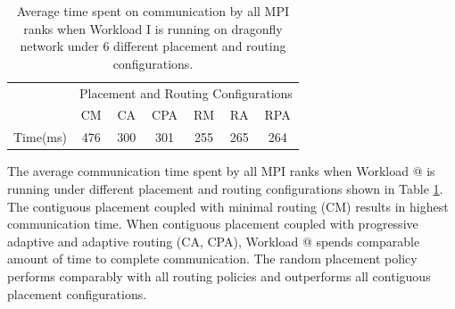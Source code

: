 \documentclass[conference,compsoc]{IEEEtran}
\makeatletter
\newcommand{\Rmnum}[1]{\expandafter\@slowromancap\romannumeral #1@}
\makeatother
\begin{document}
\begin{table}[ht]
\begin{center}
\caption{Average time spent on communication by all MPI ranks when Workload I is running on dragonfly network under 6 different placement and routing configurations.} 
\label{tab:wkld-commtime}
\begin{tabular}{l c c c c c c }
\toprule %
\toprule
&\multicolumn{6}{c}{Placement and Routing Configurations} \\ %
\cmidrule(l){2-7}
	      & CM & CA & CPA & RM & RA & RPA \\ %
\midrule %
Time(ms)  & 476  & 300  & 301  & 255  & 265  & 264  \\ %

\midrule %
\bottomrule %
\end{tabular}
\end{center}
\end{table}

The average communication time spent by all MPI ranks when Workload \Rmnum{1} is running under different placement and routing configurations shown in Table \ref{tab:wkld-commtime}. The contiguous placement coupled with minimal routing (CM) results in highest communication time. When contiguous placement coupled with progressive adaptive and adaptive routing (CA, CPA), Workload \Rmnum{1} spends  comparable amount of time to complete communication. The random placement policy performs comparably with all routing policies and outperforms all contiguous placement configurations.
\end{document}
